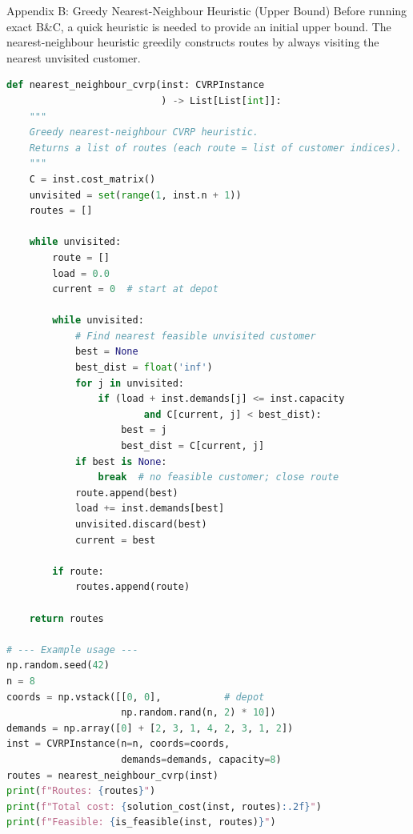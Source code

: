 \documentclass[aspectratio=169,10pt]{beamer}
\begin{document}
\begin{frame}[fragile]{Appendix B: Greedy Nearest-Neighbour Heuristic (Upper Bound)}
  Before running exact B\&C, a quick heuristic is needed to provide an
  initial upper bound. The nearest-neighbour heuristic greedily constructs
  routes by always visiting the nearest unvisited customer.

\begin{lstlisting}[language=Python, caption={Nearest-neighbour heuristic for CVRP}]
def nearest_neighbour_cvrp(inst: CVRPInstance
                           ) -> List[List[int]]:
    """
    Greedy nearest-neighbour CVRP heuristic.
    Returns a list of routes (each route = list of customer indices).
    """
    C = inst.cost_matrix()
    unvisited = set(range(1, inst.n + 1))
    routes = []

    while unvisited:
        route = []
        load = 0.0
        current = 0  # start at depot

        while unvisited:
            # Find nearest feasible unvisited customer
            best = None
            best_dist = float('inf')
            for j in unvisited:
                if (load + inst.demands[j] <= inst.capacity
                        and C[current, j] < best_dist):
                    best = j
                    best_dist = C[current, j]
            if best is None:
                break  # no feasible customer; close route
            route.append(best)
            load += inst.demands[best]
            unvisited.discard(best)
            current = best

        if route:
            routes.append(route)

    return routes

# --- Example usage ---
np.random.seed(42)
n = 8
coords = np.vstack([[0, 0],           # depot
                    np.random.rand(n, 2) * 10])
demands = np.array([0] + [2, 3, 1, 4, 2, 3, 1, 2])
inst = CVRPInstance(n=n, coords=coords,
                    demands=demands, capacity=8)
routes = nearest_neighbour_cvrp(inst)
print(f"Routes: {routes}")
print(f"Total cost: {solution_cost(inst, routes):.2f}")
print(f"Feasible: {is_feasible(inst, routes)}")
\end{lstlisting}
\end{frame}
\end{document}

